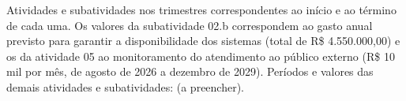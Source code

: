 \documentclass[12pt,a4paper]{article}
\newlength{\colNum}\newlength{\colAtiv}\newlength{\colTri}
\begin{document}
Atividades e subatividades nos trimestres correspondentes ao início e ao término de cada uma. Os valores da subatividade 02.b correspondem ao gasto anual previsto para garantir a disponibilidade dos sistemas (total de R\$ 4.550.000,00) e os da atividade 05 ao monitoramento do atendimento ao público externo (R\$ 10 mil por mês, de agosto de 2026 a dezembro de 2029). Períodos e valores das demais atividades e subatividades: (a preencher).

\begingroup
\singlespacing
{}
\setlength{\arrayrulewidth}{0.4pt}
\setlength{\tabcolsep}{3.5pt}
\renewcommand{\arraystretch}{1.1}
\setlength{\colTri}{\dimexpr0.049383\textwidth-2\tabcolsep\relax}
\setlength{\colNum}{\dimexpr0.03155\textwidth-2\tabcolsep\relax}
\setlength{\colAtiv}{\dimexpr\textwidth-\colNum-14\colTri-32\tabcolsep-17\arrayrulewidth\relax}
\newcommand{\vaotri}[1]{\dimexpr #1\dimexpr\colTri+2\tabcolsep+\arrayrulewidth\relax-2\tabcolsep-\arrayrulewidth\relax}
\newcommand{\rotulo}[1]{\multicolumn{2}{|>{\cellcolor{cinzaMedio}}m{\dimexpr\colNum+\colAtiv+2\tabcolsep+\arrayrulewidth\relax}|}{\bfseries #1}}
\end{document}
